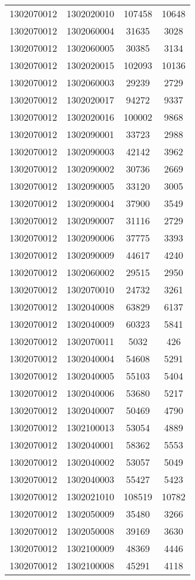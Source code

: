 \begin{longtable}{llcc}
1302070012 & 1302020010 & 107458 & 10648\\
1302070012 & 1302060004 & 31635 & 3028\\
1302070012 & 1302060005 & 30385 & 3134\\
1302070012 & 1302020015 & 102093 & 10136\\
1302070012 & 1302060003 & 29239 & 2729\\
1302070012 & 1302020017 & 94272 & 9337\\
1302070012 & 1302020016 & 100002 & 9868\\
1302070012 & 1302090001 & 33723 & 2988\\
1302070012 & 1302090003 & 42142 & 3962\\
1302070012 & 1302090002 & 30736 & 2669\\
1302070012 & 1302090005 & 33120 & 3005\\
1302070012 & 1302090004 & 37900 & 3549\\
1302070012 & 1302090007 & 31116 & 2729\\
1302070012 & 1302090006 & 37775 & 3393\\
1302070012 & 1302090009 & 44617 & 4240\\
1302070012 & 1302060002 & 29515 & 2950\\
1302070012 & 1302070010 & 24732 & 3261\\
1302070012 & 1302040008 & 63829 & 6137\\
1302070012 & 1302040009 & 60323 & 5841\\
1302070012 & 1302070011 & 5032 & 426\\
1302070012 & 1302040004 & 54608 & 5291\\
1302070012 & 1302040005 & 55103 & 5404\\
1302070012 & 1302040006 & 53680 & 5217\\
1302070012 & 1302040007 & 50469 & 4790\\
1302070012 & 1302100013 & 53054 & 4889\\
1302070012 & 1302040001 & 58362 & 5553\\
1302070012 & 1302040002 & 53057 & 5049\\
1302070012 & 1302040003 & 55427 & 5423\\
1302070012 & 1302021010 & 108519 & 10782\\
1302070012 & 1302050009 & 35480 & 3266\\
1302070012 & 1302050008 & 39169 & 3630\\
1302070012 & 1302100009 & 48369 & 4446\\
1302070012 & 1302100008 & 45291 & 4118\\

\end{longtable}
